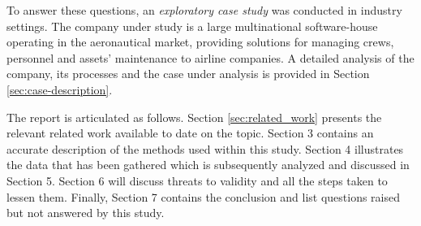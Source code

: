 To answer these questions, an \textit{exploratory case study} was conducted in industry settings. The company under study is a large multinational software-house operating in the aeronautical market, providing solutions for managing crews, personnel and assets' maintenance to airline companies. A detailed analysis of the company, its processes and the case under analysis is provided in Section \ref{sec:case-description}.

The report is articulated as follows. Section \ref{sec:related_work} presents the relevant related work available to date on the topic. Section 3 contains an accurate description of the methods used within this study. Section 4 illustrates the data that has been gathered which is subsequently analyzed and discussed in Section 5. Section 6 will discuss threats to validity and all the steps taken to lessen them. Finally, Section 7 contains the conclusion and list questions raised but not answered by this study.


